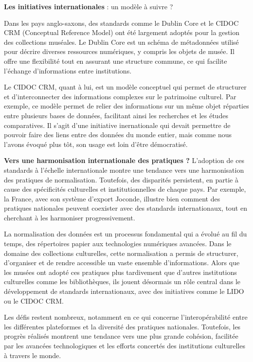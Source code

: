 \textbf{Les initiatives internationales} : un modèle à suivre ?\newline

Dans les pays anglo-saxons, des standards comme le Dublin Core et le CIDOC CRM (Conceptual Reference Model) ont été largement adoptés pour la gestion des collections muséales. Le Dublin Core est un schéma de métadonnées utilisé pour décrire diverses ressources numériques, y compris les objets de musée. Il offre une flexibilité tout en assurant une structure commune, ce qui facilite l'échange d'informations entre institutions. \newline

Le CIDOC CRM, quant à lui, est un modèle conceptuel qui permet de structurer et d’interconnecter des informations complexes sur le patrimoine culturel. Par exemple, ce modèle permet de relier des informations sur un même objet réparties entre plusieurs bases de données, facilitant ainsi les recherches et les études comparatives. Il s'agit d'une initiative inernationale qui devait permettre de pouvoir faire des liens entre des données du monde entier, mais comme nous l'avons évoqué plus tôt, son usage est loin d'être démocratisé.\newline

\textbf{Vers une harmonisation internationale des pratiques ?}\newline
L'adoption de ces standards à l’échelle internationale montre une tendance vers une harmonisation des pratiques de normalisation. Toutefois, des disparités persistent, en partie à cause des spécificités culturelles et institutionnelles de chaque pays. Par exemple, la France, avec son système d'export Joconde, illustre bien comment des pratiques nationales peuvent coexister avec des standards internationaux, tout en cherchant à les harmoniser progressivement. \newline

La normalisation des données est un processus fondamental qui a évolué au fil du temps, des répertoires papier aux technologies numériques avancées. Dans le domaine des collections culturelles, cette normalisation a permis de structurer, d’organiser et de rendre accessible un vaste ensemble d’informations. Alors que les musées ont adopté ces pratiques plus tardivement que d’autres institutions culturelles comme les bibliothèques, ils jouent désormais un rôle central dans le développement de standards internationaux, avec des initiatives comme le LIDO ou le CIDOC CRM.\newline

Les défis restent nombreux, notamment en ce qui concerne l'interopérabilité entre les différentes plateformes et la diversité des pratiques nationales. Toutefois, les progrès réalisés montrent une tendance vers une plus grande cohésion, facilitée par les avancées technologiques et les efforts concertés des institutions culturelles à travers le monde.
